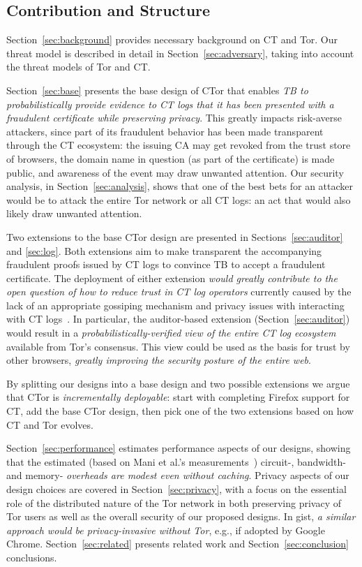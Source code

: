 \subsection{Contribution and Structure}
Section~\ref{sec:background} provides necessary background on CT and Tor. Our
threat model is described in detail in Section~\ref{sec:adversary}, taking into
account the threat models of Tor and CT\@.

Section~\ref{sec:base} presents the base design of CTor that enables \emph{TB to
probabilistically provide evidence to CT logs that it has been presented with a
fraudulent certificate while preserving privacy}. This greatly impacts
risk-averse attackers, since part of its fraudulent behavior has been made
transparent through the CT ecosystem: the issuing CA may get revoked from the
trust store of browsers, the domain name in question (as part of the
certificate) is made public, and awareness of the event may draw unwanted
attention. Our security analysis, in Section~\ref{sec:analysis}, shows that one
of the best bets for an attacker would be to attack the entire Tor network or
all CT logs: an act that would also likely draw unwanted attention.

Two extensions to the base CTor design are presented in
Sections~\ref{sec:auditor} and \ref{sec:log}. Both extensions aim to make
transparent the accompanying fraudulent proofs issued by CT logs to convince TB
to accept a fraudulent certificate. The deployment of either extension
\emph{would greatly contribute to the open question of how to reduce trust in CT
log operators} currently caused by the lack of an appropriate gossiping
mechanism and privacy issues with interacting with CT
logs~\cite{minimal-gossip,nordberg,ct-with-privacy}. In particular, the
auditor-based extension (Section~\ref{sec:auditor}) would result in a
\emph{probabilistically-verified view of the entire CT log ecosystem} available
from Tor's consensus. This view could be used as the basis for trust by other
browsers, \emph{greatly improving the security posture of the entire web}.

By splitting our designs into a base design and two possible extensions we argue
that CTor is \emph{incrementally deployable}: start with completing Firefox
support for CT, add the base CTor design, then pick one of the two extensions
based on how CT and Tor evolves.

Section~\ref{sec:performance} estimates performance aspects of our designs,
showing that the estimated (based on Mani et al.'s measurements~\cite{mani})
circuit-, bandwidth- and memory- \emph{overheads are modest even without
caching}. Privacy aspects of our design choices are covered in
Section~\ref{sec:privacy}, with a focus on the essential role of the distributed
nature of the Tor network in both preserving privacy of Tor users as well as the
overall security of our proposed designs. In gist, \emph{a similar approach
would be privacy-invasive without Tor}, e.g., if adopted by Google Chrome.
Section~\ref{sec:related} presents related work and Section~\ref{sec:conclusion}
conclusions.
